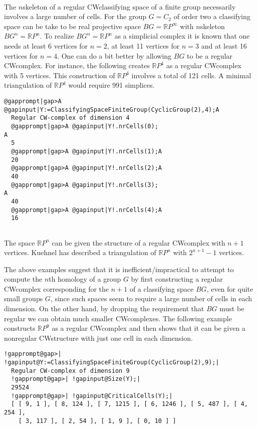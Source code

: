 \documentclass[a4paper,11pt]{report}
\begin{document}
{{\begin{Verbatim}[commandchars=!@|,fontsize=\small,frame=single,label=Example]
  
\end{Verbatim}
 The $n$\texttt{}skeleton of a regular CW\texttt{}classifying
space of a finite group necessarily involves a large number of cells. For the
group $G=C_2$ of order two a classifying space can be take to be real projective space $BG=\mathbb RP^\infty$ with $n$\texttt{}skeleton $BG^n=\mathbb RP^n$. To realize $BG^n=\mathbb RP^n$ as a simplicial complex it is known that one needs at least 6 vertices for $n=2$, at least 11 vertices for $n=3$ and at least 16 vertices for $n=4$. One can do a bit better by allowing $BG$ to be a regular CW\texttt{}complex. For instance, the following
creates $\mathbb RP^4$ as a regular CW\texttt{}complex with 5 vertices. This construction
of $\mathbb RP^4$ involves a total of 121 cells. A minimal triangulation of $\mathbb RP^4$ would require 991 simplices. 
\begin{Verbatim}[commandchars=@|A,fontsize=\small,frame=single,label=Example]
  @gapprompt|gap>A @gapinput|Y:=ClassifyingSpaceFiniteGroup(CyclicGroup(2),4);A
  Regular CW-complex of dimension 4
  @gapprompt|gap>A @gapinput|Y!.nrCells(0);                                   A
  5
  @gapprompt|gap>A @gapinput|Y!.nrCells(1);A
  20
  @gapprompt|gap>A @gapinput|Y!.nrCells(2);A
  40
  @gapprompt|gap>A @gapinput|Y!.nrCells(3);                                   A
  40
  @gapprompt|gap>A @gapinput|Y!.nrCells(4);A
  16
  
\end{Verbatim}
 The space $\mathbb RP^n$ can be given the structure of a regular CW\texttt{}complex with $n+1$ vertices. Kuehnel has described a triangulation of $\mathbb RP^n$ with $2^{n+1}-1$ vertices. 

The above examples suggest that it is inefficient/impractical to attempt to
compute the $n$\texttt{}th homology of a group $G$ by first constructing a regular CW\texttt{}complex corresponding
for the $n+1$ of a classifying space $BG$, even for quite small groups $G$, since such spaces seem to require a large number of cells in each dimension.
On the other hand, by dropping the requirement that $BG$ must be regular we can obtain much smaller CW\texttt{}complexes.
The following example constructs $\mathbb RP^9$ as a regular CW\texttt{}complex and then shows that it can be given
a non\texttt{}regular CW\texttt{}structure with just one
cell in each dimension. 
\begin{Verbatim}[commandchars=!@|,fontsize=\small,frame=single,label=Example]
  !gapprompt@gap>| !gapinput@Y:=ClassifyingSpaceFiniteGroup(CyclicGroup(2),9);|
  Regular CW-complex of dimension 9
  !gapprompt@gap>| !gapinput@Size(Y);|
  29524
  !gapprompt@gap>| !gapinput@CriticalCells(Y);|
  [ [ 9, 1 ], [ 8, 124 ], [ 7, 1215 ], [ 6, 1246 ], [ 5, 487 ], [ 4, 254 ], 
    [ 3, 117 ], [ 2, 54 ], [ 1, 9 ], [ 0, 10 ] ]
  

\end{Verbatim}}}
\end{document}
